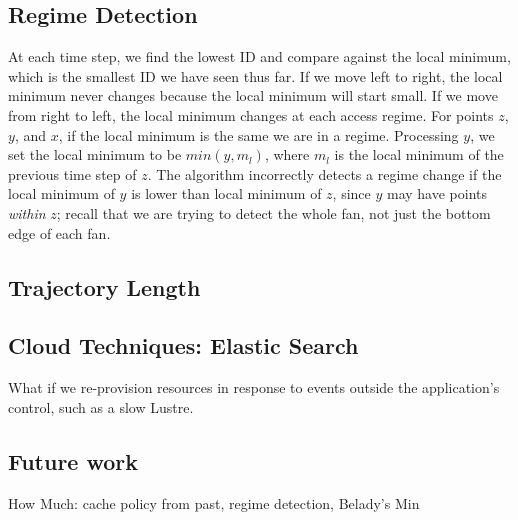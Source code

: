 \subsection{Regime Detection}

At each time step, we find the lowest ID and compare against the local minimum,
which is the smallest ID we have seen thus far. If we move left to right, the
local minimum never changes because the local minimum will start small. If we
move from right to left, the local minimum changes at each access regime.  For
points \(z\), \(y\), and \(x\), if the local minimum is the same we are in a
regime. Processing \(y\), we set the local minimum to be \(min(y, m_l)\), where
\(m_l\) is the local minimum of the previous time step of \(z\). The algorithm
incorrectly detects a regime change if the local minimum of \(y\) is lower than
local minimum of \(z\), since \(y\) may have points {\it within} \(z\); recall
that we are trying to detect the whole fan, not just the bottom edge of each
fan.

\subsection{Trajectory Length}

\subsection{Cloud Techniques: Elastic Search}

What if we re-provision resources in response to events outside the
application's control, such as a slow Lustre.

\subsection{Future work}

How Much: cache policy from past, regime detection, Belady's Min
